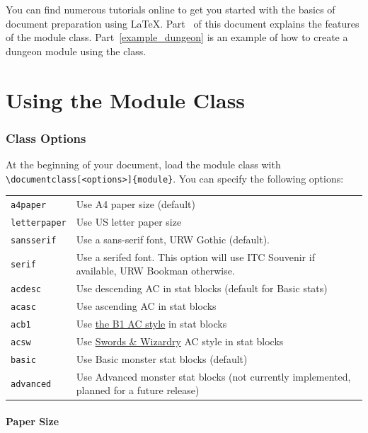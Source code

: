 \documentclass[letterpaper,serif]{module}
\begin{document}
You can find numerous tutorials online to get you started with the basics of document preparation using \LaTeX.
Part~\ref{using_the_module_class} of this document explains the features of the module class. Part~\ref{example_dungeon}
is an example of how to create a dungeon module using the class.

\part{Using the Module Class}
\label{using_the_module_class}

\section{Class Options}

At the beginning of your document, load the module class with \verb|\documentclass[<options>]{module}|. You can
specify the following options:

\begin{tabularx}{\linewidth}{lX}
\verb|a4paper|     & Use A4 paper size (default)\\
\verb|letterpaper| & Use US letter paper size\\
\verb|sansserif|   & Use a sans-serif font, URW Gothic (default).\\
\verb|serif|       & Use a serifed font. This option will use ITC Souvenir if available, URW Bookman otherwise.\\
\verb|acdesc|      & Use descending AC in stat blocks (default for Basic stats)\\
\verb|acasc|       & Use ascending AC in stat blocks\\
\verb|acb1|        & Use \href{http://zenopusarchives.blogspot.com/2014/02/ascending-ac-in-holmes-basic.html}{the B1 AC style} in stat blocks\\
\verb|acsw|        & Use \href{http://www.swordsandwizardry.com/}{Swords \& Wizardry} AC style in stat blocks\\
\verb|basic|       & Use Basic monster stat blocks (default)\\
\verb|advanced|    & Use Advanced monster stat blocks (not currently implemented, planned for a future release)\\
\end{tabularx}

\subsection*{Paper Size}
\end{document}
